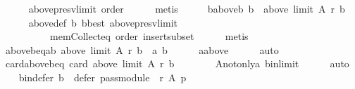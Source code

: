 \begin{isabellebody}
\ \ \ \ \isamarkupfalse%
\ above{\isacharunderscore}{\kern0pt}presv{\isacharunderscore}{\kern0pt}limit\ order\isanewline
\ \ \ \ \isamarkupfalse%
\ metis\isanewline
\ \ \isamarkupfalse%
\ \isamarkupfalse%
\ b{\isacharunderscore}{\kern0pt}above{\isacharunderscore}{\kern0pt}b{\isacharcolon}{\kern0pt}\ {\isachardoublequoteopen}b\ {\isasymin}\ above\ {\isacharparenleft}{\kern0pt}limit\ A\ r{\isacharparenright}{\kern0pt}\ b{\isachardoublequoteclose}\isanewline
\ \ \ \ \isamarkupfalse%
\ above{\isacharunderscore}{\kern0pt}def\ b\ b{\isacharunderscore}{\kern0pt}best\ above{\isacharunderscore}{\kern0pt}presv{\isacharunderscore}{\kern0pt}limit\isanewline
\ \ \ \ \ \ \ \ \ \ mem{\isacharunderscore}{\kern0pt}Collect{\isacharunderscore}{\kern0pt}eq\ order\ insert{\isacharunderscore}{\kern0pt}subset\isanewline
\ \ \ \ \isamarkupfalse%
\ metis\isanewline
\ \ \isamarkupfalse%
\ \isamarkupfalse%
\ above{\isacharunderscore}{\kern0pt}b{\isacharunderscore}{\kern0pt}eq{\isacharunderscore}{\kern0pt}ab{\isacharcolon}{\kern0pt}\ {\isachardoublequoteopen}above\ {\isacharparenleft}{\kern0pt}limit\ A\ r{\isacharparenright}{\kern0pt}\ b\ {\isacharequal}{\kern0pt}\ {\isacharbraceleft}{\kern0pt}a{\isacharcomma}{\kern0pt}\ b{\isacharbraceright}{\kern0pt}{\isachardoublequoteclose}\isanewline
\ \ \ \ \isamarkupfalse%
\ a{\isacharunderscore}{\kern0pt}above\isanewline
\ \ \ \ \isamarkupfalse%
\ auto\isanewline
\ \ \isamarkupfalse%
\ card{\isacharunderscore}{\kern0pt}above{\isacharunderscore}{\kern0pt}b{\isacharunderscore}{\kern0pt}eq{\isacharunderscore}{\kern0pt}{}{\isacharcolon}{\kern0pt}\ {\isachardoublequoteopen}card\ {\isacharparenleft}{\kern0pt}above\ {\isacharparenleft}{\kern0pt}limit\ A\ r{\isacharparenright}{\kern0pt}\ b{\isacharparenright}{\kern0pt}\ {\isacharequal}{\kern0pt}\ {}{\isachardoublequoteclose}\isanewline
\ \ \ \ \isamarkupfalse%
\ A{\isacharunderscore}{\kern0pt}not{\isacharunderscore}{\kern0pt}only{\isacharunderscore}{\kern0pt}a\ b{\isacharunderscore}{\kern0pt}in{\isacharunderscore}{\kern0pt}limit\isanewline
\ \ \ \ \isamarkupfalse%
\ auto\isanewline
\ \ \isamarkupfalse%
\ b{\isacharunderscore}{\kern0pt}in{\isacharunderscore}{\kern0pt}defer{\isacharcolon}{\kern0pt}\ {\isachardoublequoteopen}b\ {\isasymin}\ defer\ {\isacharparenleft}{\kern0pt}pass{\isacharunderscore}{\kern0pt}module\ {}\ r{\isacharparenright}{\kern0pt}\ A\ p{\isachardoublequoteclose}\isanewline

\end{isabellebody}

